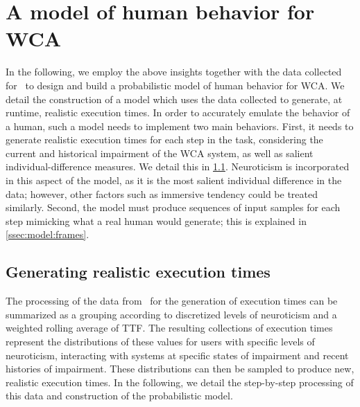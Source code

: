 \section{A model of human behavior for \ac{WCA}}\label{sec:model}

In the following, we employ the above insights together with the data collected for~\cite{olguinmunoz:impact2021} to design and build a probabilistic model of human behavior for \ac{WCA}.
We detail the construction of a model which uses the data collected to generate, at runtime, realistic execution times. 
In order to accurately emulate the behavior of a human, such a model needs to implement two main behaviors.
First, it needs to generate realistic execution times for each step in the task, considering the current and historical impairment of the \ac{WCA} system, as well as salient individual-difference measures.
We detail this in \cref{ssec:model:exectimes}.
Neuroticism is incorporated in this aspect of the model, as it is the most salient individual difference in the data; however, other factors such as immersive tendency could be treated similarly.
Second, the model must produce sequences of input samples for each step mimicking what a real human would generate; this is explained in \cref{ssec:model:frames}. 


\subsection{Generating realistic execution times}\label{ssec:model:exectimes}

The processing of the data from~\cite{olguinmunoz:impact2021} for the generation of execution times can be summarized as a grouping according to discretized levels of neuroticism and a weighted rolling average of \ac{TTF}.
The resulting collections of execution times represent the distributions of these values for users with specific levels of neuroticism, interacting with systems at specific states of impairment and recent histories of impairment.
These distributions can then be sampled to produce new, realistic execution times.
In the following, we detail the step-by-step processing of this data and construction of the probabilistic model.


